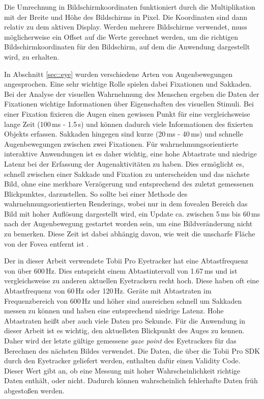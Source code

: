 Die Umrechnung in Bildschirmkoordinaten funktioniert durch die Multiplikation mit der Breite und Höhe des Bildschirms in Pixel.
Die Koordinaten sind dann relativ zu dem aktiven Display.
Werden mehrere Bildschirme verwendet, muss möglicherweise ein Offset auf die Werte gerechnet werden, um die richtigen Bildschirmkoordinaten für den Bildschirm, auf dem die Anwendung dargestellt wird, zu erhalten.

In Abschnitt \ref{sec::eye} wurden verschiedene Arten von Augenbewegungen angesprochen.
Eine sehr wichtige Rolle spielen dabei Fixationen und Sakkaden.
Bei der Analyse der visuellen Wahrnehmung des Menschen ergeben die Daten der Fixationen wichtige Informationen über Eigenschaften des visuellen Stimuli.
Bei einer Fixation fixieren die Augen einen gewissen Punkt für eine vergleichsweise lange Zeit (100\,ms - 1.5\,s) und können dadurch viele Informationen des fixierten Objekts erfassen.
Sakkaden hingegen sind kurze (20\,ms - 40\,ms) und schnelle Augenbewegungen zwischen zwei Fixationen.
Für wahrnehmungsorientierte interaktive Anwendungen ist es daher wichtig, eine hohe Abtastrate und niedrige Latenz bei der Erfassung der Augenaktivitäten zu haben.
Dies ermöglicht es, schnell zwischen einer Sakkade und Fixation zu unterscheiden und das nächste Bild, ohne eine merkbare Verzögerung und entsprechend des zuletzt gemessenen Blickpunktes, darzustellen.
So sollte bei einer Methode des wahrnehmungsorientierten Renderings, wobei nur in dem fovealen Bereich das Bild mit hoher Auflösung dargestellt wird, ein Update ca. zwischen 5\,ms bis 60\,ms nach der Augenbewegung gestartet worden sein, um eine Bildveränderung nicht zu bemerken.
Diese Zeit ist dabei abhängig davon, wie weit die unscharfe Fläche von der Fovea entfernt ist \cite{doi:10.1111/cgf.13150}.

Der in dieser Arbeit verwendete Tobii Pro Eyetracker hat eine Abtastfrequenz von über 600\,Hz.
Dies entspricht einem Abtastintervall von 1.67\,ms und ist vergleichsweise zu anderen aktuellen Eyetrackern recht hoch.
Diese haben oft eine Abtastfrequenz von 60\,Hz oder 120\,Hz.
Geräte mit Abtastraten im Frequenzbereich von 600\,Hz und höher sind ausreichen schnell um Sakkaden messen zu können und haben eine entsprechend niedrige Latenz.
Hohe Abtastraten heißt aber auch viele Daten pro Sekunde.
Für die Anwendung in dieser Arbeit ist es wichtig, den aktuellsten Blickpunkt des Auges zu kennen.
Daher wird der letzte gültige gemessene \emph{gaze point} des Eyetrackers für das Berechnen des nächsten Bildes verwendet.
Die Daten, die über die Tobii Pro SDK durch den Eyetracker geliefert werden, enthalten dafür einen Validity Code.
Dieser Wert gibt an, ob eine Messung mit hoher Wahrscheinlichkeit richtige Daten enthält, oder nicht.
Dadurch können wahrscheinlich fehlerhafte Daten früh abgestoßen werden.

